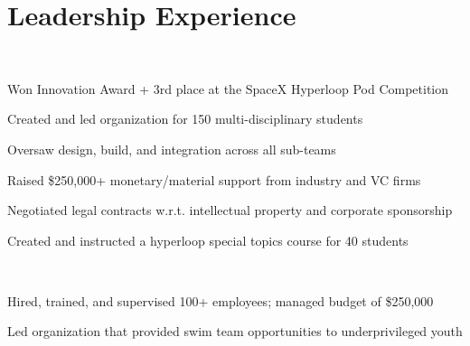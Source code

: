 \documentclass[]{deedy-resume-openfont}
\begin{document}
\begin{minipage}[t]{0.68\textwidth}
\section{Leadership Experience}
\\
\vspace{\topsep}
\vspace{-4mm}
\begin{tightemize}
\item Won Innovation Award + 3rd place at the SpaceX Hyperloop Pod Competition
\item Created and led organization for 150 multi-disciplinary students
\item Oversaw design, build, and integration across all sub-teams
\item Raised \$250,000+ monetary/material support from industry and VC firms
\item Negotiated legal contracts w.r.t. intellectual property and corporate sponsorship
\item Created and instructed a hyperloop special topics course for 40 students
\end{tightemize}
\sectionsep

\\
\vspace{\topsep}
\vspace{-4mm}
\begin{tightemize}
\item Hired, trained, and supervised 100+ employees; managed budget of \$250,000
\item Led organization that provided swim team opportunities to underprivileged youth
\end{tightemize}
\sectionsep


\end{minipage} 
\end{document}

